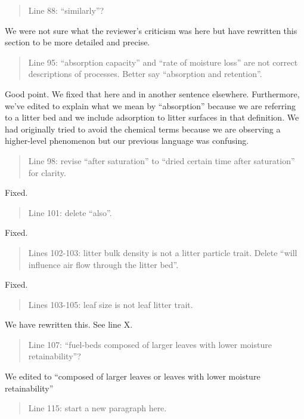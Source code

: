 \documentclass[letterpaper, 12pt]{letter}
\begin{document}
\begin{letter}{}
\begin{quote}
Line 88: “similarly”?
\end{quote}

We were not sure what the reviewer's criticism was here but have rewritten this
section to be more detailed and precise.

\begin{quote}
  Line 95: “absorption capacity” and “rate of moisture loss” are not correct
  descriptions of processes. Better say “absorption and retention”.
\end{quote}

Good point. We fixed that here and in another sentence elsewhere. Furthermore,
we've edited to explain what we mean by ``absorption'' because we are referring
to a litter bed and we include adsorption to litter surfaces in that
definition. We had originally tried to avoid the chemical terms because we are
observing a higher-level phenomenon but our previous language was confusing.

\begin{quote}
  Line 98: revise “after saturation” to “dried certain time after saturation”
  for clarity.
\end{quote}

Fixed.

\begin{quote}
  Line 101: delete “also”.
\end{quote}

Fixed.

\begin{quote}
  Lines 102-103: litter bulk density is not a litter particle trait. Delete
  “will influence air flow through the litter bed”.
\end{quote}

Fixed.

\begin{quote}
  Lines 103-105: leaf size is not leaf litter trait.
\end{quote}

We have rewritten this. See line X.

\begin{quote}
  Line 107: “fuel-beds composed of larger leaves with lower moisture
  retainability”?
\end{quote}

We edited to ``composed of larger leaves or leaves with lower moisture
retainability''

\begin{quote}
  Line 115: start a new paragraph here.
\end{quote}


\end{letter}
\end{document}
